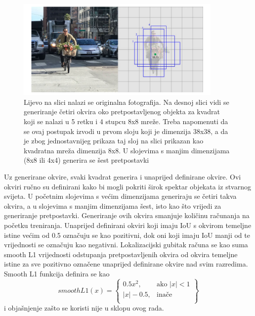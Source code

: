 \begin{figure}[htb]
    \centering
    \includegraphics[width=10cm]{img/SSD-okviri.png}
    \caption{Lijevo na slici nalazi se originalna fotografija. Na desnoj slici vidi se generiranje četiri okvira oko pretpostavljenog objekta za kvadrat koji se 
    nalazi u 5 retku i 4 stupcu 8x8 mreže. Treba napomenuti da se ovaj postupak izvodi u prvom sloju koji je dimenzija 38x38, a da je zbog jednostavnijeg prikaza 
    taj sloj na slici prikazan kao kvadratna mreža dimenzija 8x8. U slojevima s manjim dimenzijama (8x8 ili 4x4) generira se šest pretpostavki}
    \label{SSD okvir}
\end{figure}

Uz generirane okvire, svaki kvadrat generira i unaprijed definirane okvire. Ovi okviri ručno su definirani kako bi mogli pokriti širok spektar objekata iz stvarnog svijeta.
U početnim slojevima s većim dimenzijama generiraju se četiri takva okvira, a u slojevima s manjim dimenzijama šest, isto kao što vrijedi za generiranje pretpostavki.
Generiranje ovih okvira smanjuje količinu računanja na početku treniranja.
Unaprijed definirani okviri koji imaju IoU s okvirom temeljne istine većim od 0.5 označuju se kao pozitivni, dok oni koji imaju IoU manji od te vrijednosti se označuju kao negativni.
Lokalizacijski gubitak računa se kao suma smooth L1 vrijednosti odstupanja pretpostavljenih okvira od okvira temeljne istine za sve pozitivno označene unaprijed definirane okvire nad svim razredima. 
Smooth L1 funkcija definira se kao 
\[
    smoothL1(x) = \left\{\begin{array}{lr}
        0.5x^2, & \text{ako } |x| <  1\\
        |x|- 0.5, & \text{inače } \\
        \end{array}\right\}
\]
i objašnjenje zašto se koristi nije u sklopu ovog rada. \citep{DBLP:journals/corr/LiuAESR15}
